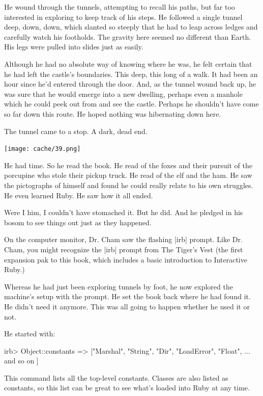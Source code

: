 \documentclass[12pt,twoside]{report}
\begin{document}
He wound through the tunnels, attempting to recall his paths, but far
too interested in exploring to keep track of his steps.  He followed a
single tunnel deep, down, down, which slanted so steeply that he had
to leap across ledges and carefully watch his footholds. The gravity
here seemed no different than Earth.  His legs were pulled into slides
just as easily.

Although he had no absolute way of knowing where he was, he felt
certain that he had left the castle's boundaries.  This deep, this
long of a walk.  It had been an hour since he'd entered through the
door.  And, as the tunnel wound back up, he was sure that he would
emerge into a new dwelling, perhaps even a manhole which he could peek
out from and see the castle.  Perhaps he shouldn't have come so far
down this route.  He hoped nothing was hibernating down here.

The tunnel came to a stop.  A dark, dead end.

	\texttt{[image: cache/39.png]}

He had time.  So he read the book.  He read of the foxes and their
pursuit of the porcupine who stole their pickup truck.  He read of the
elf and the ham.  He saw the pictographs of himself and found he could
really relate to his own struggles.  He even learned Ruby.  He saw how
it all ended.

Were I him, I couldn't have stomached it.  But he did.  And he pledged
in his bosom to see things out just as they happened.

On the computer monitor, Dr. Cham saw the flashing
\rubyinline|irb| prompt.  Like Dr. Cham, you might
recognize the \rubyinline|irb| prompt from The Tiger's
Vest (the first expansion pak to this book, which includes a basic
introduction to Interactive Ruby.)

Whereas he had just been exploring tunnels by foot, he now explored
the machine's setup with the prompt.  He set the book back where he
had found it.  He didn't need it anymore.  This was all going to
happen whether he used it or not.

He started with:


\begin{consolecode}

 irb> Object::constants
   => ["Marshal", "String", "Dir", "LoadError", "Float", ... and so on ]

\end{consolecode}


This command lists all the top-level constants.  Classes are also
listed as constants, so this list can be great to see what's loaded
into Ruby at any time.
\end{document}
